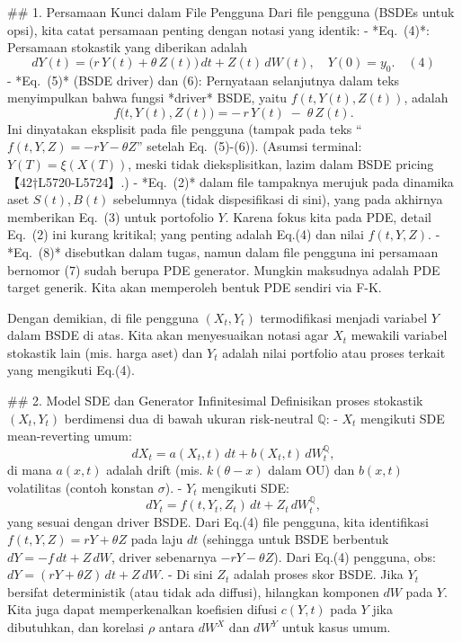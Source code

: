 \documentclass{article}
\begin{document}
## 1. Persamaan Kunci dalam File Pengguna  
Dari file pengguna (BSDEs untuk opsi), kita catat persamaan penting dengan notasi yang identik:  
- *Eq. (4)*: Persamaan stokastik yang diberikan adalah  
  $$
  dY(t) = \bigl(r\,Y(t) + \theta\,Z(t)\bigr)\,dt + Z(t)\,dW(t), \quad Y(0)=y_0. \quad(4)
  $$  
- *Eq. (5)* (BSDE driver) dan (6): Pernyataan selanjutnya dalam teks menyimpulkan bahwa fungsi *driver* BSDE, yaitu \(f(t,Y(t),Z(t))\), adalah  
  $$
  f\bigl(t,Y(t),Z(t)\bigr) = -\,r\,Y(t) \;-\; \theta\,Z(t). 
  $$  
  Ini dinyatakan eksplisit pada file pengguna (tampak pada teks “\(f(t,Y,Z) = -rY -\theta Z\)” setelah Eq. (5)-(6)). (Asumsi terminal: \(Y(T)=\xi(X(T))\), meski tidak dieksplisitkan, lazim dalam BSDE pricing【42†L5720-L5724】.)  
- *Eq. (2)* dalam file tampaknya merujuk pada dinamika aset \(S(t),B(t)\) sebelumnya (tidak dispesifikasi di sini), yang pada akhirnya memberikan Eq. (3) untuk portofolio \(Y\). Karena fokus kita pada PDE, detail Eq. (2) ini kurang kritikal; yang penting adalah Eq.(4) dan nilai \(f(t,Y,Z)\).  
- *Eq. (8)* disebutkan dalam tugas, namun dalam file pengguna ini persamaan bernomor (7) sudah berupa PDE generator. Mungkin maksudnya adalah PDE target generik. Kita akan memperoleh bentuk PDE sendiri via F-K.  

Dengan demikian, di file pengguna \((X_t,Y_t)\) termodifikasi menjadi variabel \(Y\) dalam BSDE di atas. Kita akan menyesuaikan notasi agar \(X_t\) mewakili variabel stokastik lain (mis. harga aset) dan \(Y_t\) adalah nilai portfolio atau proses terkait yang mengikuti Eq.(4).

## 2. Model SDE dan Generator Infinitesimal  
Definisikan proses stokastik \((X_t,Y_t)\) berdimensi dua di bawah ukuran risk-neutral \(\mathbb{Q}\):  
- \(X_t\) mengikuti SDE mean-reverting umum:  
  $$
  dX_t = a(X_t,t)\,dt + b(X_t,t)\,dW_t^{\mathbb{Q}},
  $$  
  di mana \(a(x,t)\) adalah drift (mis. \(k(\theta-x)\) dalam OU) dan \(b(x,t)\) volatilitas (contoh konstan \(\sigma\)).  
- \(Y_t\) mengikuti SDE:  
  $$
  dY_t = f(t,Y_t,Z_t)\,dt + Z_t\,dW_t^{\mathbb{Q}},
  $$  
  yang sesuai dengan driver BSDE. Dari Eq.(4) file pengguna, kita identifikasi \(f(t,Y,Z) = rY + \theta Z\) pada laju \(dt\) (sehingga untuk BSDE berbentuk \(dY = -f\,dt + Z\,dW\), driver sebenarnya \(-rY-\theta Z\)). Dari Eq.(4) pengguna, obs: \(dY = (rY + \theta Z)\,dt + Z\,dW\).  
- Di sini \(Z_t\) adalah proses skor BSDE. Jika \(Y_t\) bersifat deterministik (atau tidak ada diffusi), hilangkan komponen \(dW\) pada \(Y\). Kita juga dapat memperkenalkan koefisien difusi \(c(Y,t)\) pada \(Y\) jika dibutuhkan, dan korelasi \(\rho\) antara \(dW^X\) dan \(dW^Y\) untuk kasus umum.  
\end{document}
